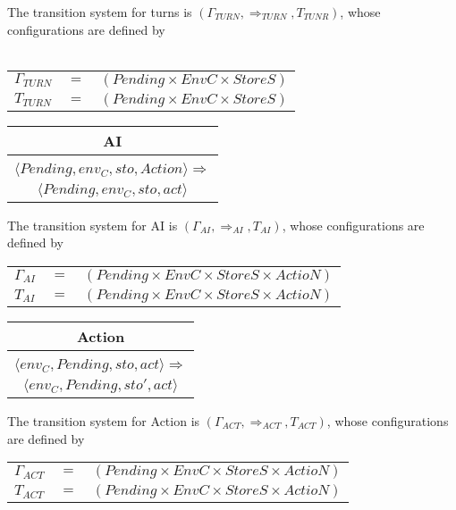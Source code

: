 The transition system for turns is $(\Gamma_{TURN}, \Rightarrow_{TURN}, T_{TUNR})$, whose configurations are defined by\\
\\
\begin{tabular}{l l l }
$\Gamma_{TURN}$ & $=$ & $(Pending \times EnvC \times StoreS)$ \\
$T_{TURN}$ & $=$ & $(Pending \times EnvC \times StoreS)$\\
\end{tabular}

\begin{center}
\begin{tabular}{ c }
\textbf{AI}\\
\hline
 \\
$\langle Pending, env_{C}, sto, Action \rangle \Rightarrow$\\
$\langle Pending, env_{C}, sto, act \rangle$\\
\end{tabular}
\end{center}
The transition system for AI is $(\Gamma_{AI}, \Rightarrow_{AI}, T_{AI})$, whose configurations are defined by \\
\begin{tabular}{l l l }
$\Gamma_{AI}$ & $=$ & $(Pending \times EnvC \times StoreS \times ActioN)$ \\
$T_{AI}$ & $=$ & $(Pending \times EnvC \times StoreS \times ActioN)$ \\

\end{tabular}
\begin{center}
\begin{tabular}{ c }
\textbf{Action}\\
\hline
 \\
$\langle env_{C}, Pending, sto, act \rangle \Rightarrow$\\
$\langle env_{C}, Pending, sto', act \rangle$\\
\end{tabular}
\end{center}
The transition system for Action is $(\Gamma_{ACT}, \Rightarrow_{ACT}, T_{ACT})$, whose configurations are defined by \\
\begin{tabular}{l l l }
$\Gamma_{ACT}$ & $=$ & $(Pending \times EnvC \times StoreS \times ActioN)$ \\
$T_{ACT}$ & $=$ & $(Pending \times EnvC \times StoreS \times ActioN)$ \\

\end{tabular}
